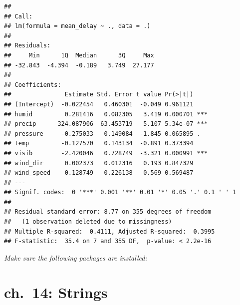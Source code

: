 \documentclass[]{book}
\newenvironment{Shaded}{\begin{snugshade}}{\end{snugshade}}
\newcommand{\DataTypeTok}[1]{\textcolor[rgb]{0.13,0.29,0.53}{#1}}
\newcommand{\KeywordTok}[1]{\textcolor[rgb]{0.13,0.29,0.53}{\textbf{#1}}}
\newcommand{\NormalTok}[1]{#1}
\newcommand{\OperatorTok}[1]{\textcolor[rgb]{0.81,0.36,0.00}{\textbf{#1}}}
\newcommand{\StringTok}[1]{\textcolor[rgb]{0.31,0.60,0.02}{#1}}
\theoremstyle{definition}
\theoremstyle{definition}
\theoremstyle{definition}
\theoremstyle{remark}
\begin{document}
\begin{Shaded}
\end{Shaded}

\begin{verbatim}
## 
## Call:
## lm(formula = mean_delay ~ ., data = .)
## 
## Residuals:
##     Min      1Q  Median      3Q     Max 
## -32.843  -4.394  -0.189   3.749  27.177 
## 
## Coefficients:
##               Estimate Std. Error t value Pr(>|t|)    
## (Intercept)  -0.022454   0.460301  -0.049 0.961121    
## humid         0.281416   0.082305   3.419 0.000701 ***
## precip      324.087906  63.453719   5.107 5.34e-07 ***
## pressure     -0.275033   0.149084  -1.845 0.065895 .  
## temp         -0.127570   0.143134  -0.891 0.373394    
## visib        -2.420046   0.728749  -3.321 0.000991 ***
## wind_dir      0.002373   0.012316   0.193 0.847329    
## wind_speed    0.128749   0.226138   0.569 0.569487    
## ---
## Signif. codes:  0 '***' 0.001 '**' 0.01 '*' 0.05 '.' 0.1 ' ' 1
## 
## Residual standard error: 8.77 on 355 degrees of freedom
##   (1 observation deleted due to missingness)
## Multiple R-squared:  0.4111, Adjusted R-squared:  0.3995 
## F-statistic:  35.4 on 7 and 355 DF,  p-value: < 2.2e-16
\end{verbatim}

\emph{Make sure the following packages are installed:}

\hypertarget{ch.-14-strings}{%
\chapter{ch.~14: Strings}\label{ch.-14-strings}}
\end{document}
